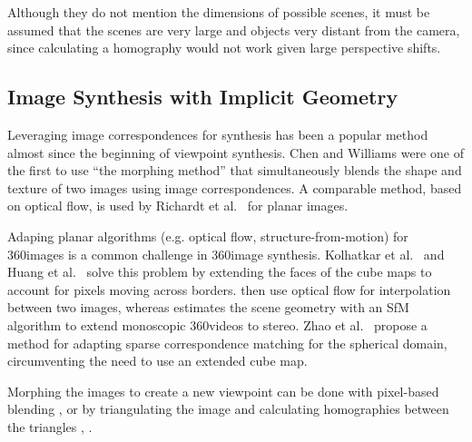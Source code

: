 Although they do not mention the dimensions of possible scenes, it must be assumed that the scenes are very large and objects very distant from the camera, since calculating a homography would not work given large perspective shifts.


\subsection{Image Synthesis with Implicit Geometry}
Leveraging image correspondences for synthesis has been a popular method almost since the beginning of viewpoint synthesis. Chen and Williams \cite{apple} were one of the first to use ``the morphing method'' that simultaneously blends the shape and texture of two images using image correspondences. A comparable method, based on optical flow, is used by Richardt et al.\ \cite{megastereo} for planar images.

Adaping planar algorithms (e.g. optical flow, structure-from-motion) for 360\degree images is a common challenge in 360\degree image synthesis. Kolhatkar et al.\ \cite{360flowblending} and Huang et al.\ \cite{6dof} solve this problem by extending the faces of the cube maps to account for pixels moving across borders. \cite{360flowblending} then use optical flow for interpolation between two images, whereas \cite{6dof} estimates the scene geometry with an SfM algorithm to extend monoscopic 360\degree videos to stereo. Zhao et al.\ \cite{cube2video} propose a method for adapting sparse correspondence matching for the spherical domain, circumventing the need to use an extended cube map.

Morphing the images to create a new viewpoint can be done with pixel-based blending \cite{megastereo}, \cite{360flowblending} or by triangulating the image and calculating homographies between the triangles \cite{6dof}, \cite{cube2video}.


